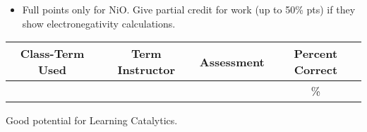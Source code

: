 \begin{rubric}

\begin{itemize}
	\item Full points only for NiO. Give partial credit for work (up to 50\% pts) if they show electronegativity calculations.
\end{itemize}

\end{rubric}

\begin{outcomes}
	\begin{center}
		\begin{tabular}{cccc}
			\hline\hline
			Class-Term Used & Term Instructor & Assessment & Percent Correct\\
			\hline
			 &  &  & \%\\    %
			\hline
		\end{tabular}
	\end{center}
\end{outcomes}

\begin{comments}

Good potential for Learning Catalytics.
	
\end{comments}
